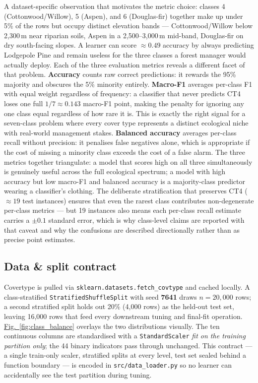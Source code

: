 \documentclass[conference]{IEEEtran}
\newcommand{\figref}[1]{\hyperref[#1]{\textcolor{denim_comp}{Fig.~\ref*{#1}}}}
\begin{document}
A dataset-specific observation that motivates the metric choice: classes 4
(Cottonwood/Willow), 5 (Aspen), and 6 (Douglas-fir) together make up under 5\%
of the rows but occupy distinct elevation bands --- Cottonwood/Willow below
2{,}300\,m near riparian soils, Aspen in a 2{,}500--3{,}000\,m mid-band,
Douglas-fir on dry south-facing slopes.
A learner can score $\approx 0.49$ accuracy by always predicting Lodgepole Pine
and remain useless for the three classes a forest manager would actually deploy.
Each of the three evaluation metrics reveals a different facet of that problem.
\textbf{Accuracy} counts raw correct predictions: it rewards the 95\% majority
and obscures the 5\% minority entirely.
\textbf{Macro-F1} \cite{sokolova2009pra} averages per-class F1 with equal weight
regardless of frequency: a classifier that never predicts CT4 loses one full
$1/7 \approx 0.143$ macro-F1 point, making the penalty for ignoring any one
class equal regardless of how rare it is.
This is exactly the right signal for a seven-class problem where every cover
type represents a distinct ecological niche with real-world management stakes.
\textbf{Balanced accuracy} averages per-class recall without precision:
it penalises false negatives alone, which is appropriate if the cost of missing
a minority class exceeds the cost of a false alarm.
The three metrics together triangulate: a model that scores high on all three
simultaneously is genuinely useful across the full ecological spectrum;
a model with high accuracy but low macro-F1 and balanced accuracy is a
majority-class predictor wearing a classifier's clothing.
The deliberate stratification that preserves CT4 ($\approx 19$ test instances)
ensures that even the rarest class contributes non-degenerate per-class metrics
--- but 19 instances also means each per-class recall estimate carries a
${\pm}0.1$ standard error, which is why class-level claims are reported with
that caveat and why the confusions are described directionally rather than as
precise point estimates.

\subsection{Data \& split contract}\label{sec:design:data}
Covertype is pulled via \texttt{sklearn.datasets.fetch\_covtype} and cached
locally. A class-stratified \texttt{StratifiedShuffleSplit} with seed
\textbf{7641} draws $n{=}20{,}000$ rows; a second stratified split holds out
20\% (4{,}000 rows) as the held-out test set, leaving 16{,}000 rows that
feed every downstream tuning and final-fit operation. \figref{fig:class_balance}
overlays the two distributions visually. The ten continuous columns are
standardised with a \texttt{StandardScaler} \emph{fit on the training partition
only}; the 44 binary indicators pass through unchanged. This contract --- a
single train-only scaler, stratified splits at every level, test set sealed
behind a function boundary --- is encoded in \texttt{src/data\_loader.py} so no
learner can accidentally see the test partition during tuning.
\end{document}
